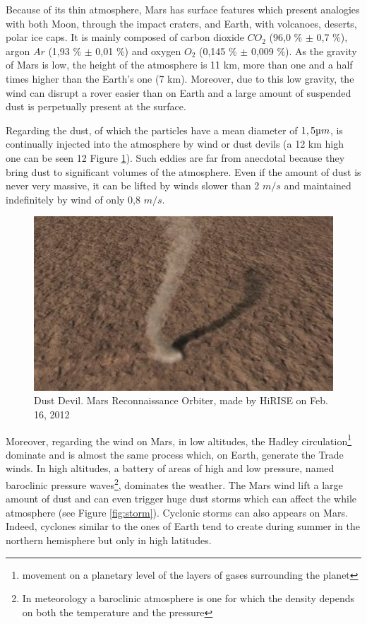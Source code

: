 Because of its thin atmosphere, Mars has surface features which present analogies with both Moon, through the impact craters, and Earth, with volcanoes, deserts, polar ice caps. It is mainly composed of carbon dioxide $CO_2$ (96,0 \% $\pm$ 0,7 \%), argon $Ar$ (1,93 \% $\pm$ 0,01 \%) and oxygen
$O_2$ (0,145 \% $\pm$ 0,009 \%). As the gravity of Mars is low, the height of the atmosphere is 11 km, more than one and a half times higher than the Earth's one (7 km). Moreover, due to this low gravity, the wind can disrupt a rover easier than on Earth and a large amount of suspended dust is perpetually present at the surface.

Regarding the dust, of which the particles have a mean diameter of $1,5 \micro m$, is continually injected into the atmosphere by wind or dust devils (a 12 km high one can be seen 12 Figure \ref{fig:poussiere}). Such eddies are far from anecdotal because they bring dust to significant volumes of the atmosphere. Even if the amount of dust is never very massive, it can be lifted by winds slower than 2 $m/s$ and maintained indefinitely by wind of only 0,8 $m/s$.

\begin{figure}[h]
  \centerline{\includegraphics[scale=0.6]{fig/poussiere.jpg}}
  \caption{Dust Devil. Mars Reconnaissance Orbiter, made by HiRISE on Feb. 16, 2012 \cite{dustDevil}}
  \label{fig:poussiere}
\end{figure}

Moreover, regarding the wind on Mars, in low altitudes, the Hadley circulation\footnote{movement on a planetary level of the layers of gases surrounding the planet} dominate and is almost the same process which, on Earth, generate the Trade winds. In high altitudes, a battery of areas of high and low pressure, named baroclinic pressure waves\footnote{In meteorology a baroclinic atmosphere is one for which the density depends on both the temperature and the pressure}, dominates the weather. The Mars wind lift a large amount of dust and can even trigger huge dust storms which can affect the while atmosphere (see Figure \ref{fig:storm}). Cyclonic storms can also appears on Mars. Indeed, cyclones similar to the ones of Earth tend to create during summer in the northern hemisphere but only in high latitudes.

